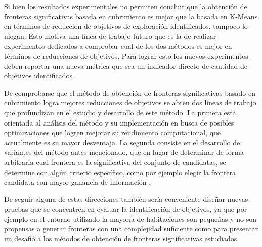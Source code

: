 
Si bien los resultados experimentales no permiten concluir que la
obtención de fronteras significativas basada en cubrimiento es mejor que la basada en K-Means
en términos de reducción de objetivos de exploración identificados, tampoco
lo niegan. Esto motiva una línea de trabajo futuro que es la de realizar
experimentos dedicados a comprobar cual de los dos métodos es mejor en términos
de reducciones de objetivos. Para lograr esto los nuevos experimentos deben
reportar una nueva métrica que sea un indicador directo de cantidad de
objetivos identificados.

De comprobarse que el método de obtención de fronteras significativas basado en
cubrimiento logra
mejores reducciones de objetivos se abren dos líneas de
trabajo que profundizan en el estudio y desarrollo de este método. La primera
está orientada al análisis del método y su implementación en busca de posibles
optimizaciones que logren mejorar su rendimiento computacional, que actualmente
es su mayor desventaja. La segunda consiste en el desarrollo de variantes del
método antes mencionado, que en lugar de determinar de forma arbitraria cual
frontera es la significativa del conjunto de candidatas, se determine con algún
criterio específico, como por ejemplo elegir la frontera candidata con mayor
ganancia de información \cite{Amorin2019}.

De seguir alguna de estas direcciones también sería conveniente diseñar nuevas
pruebas que se concentren en evaluar la identificación de objetivos, ya que por
ejemplo en el entorno utilizado la mayoría de habitaciones son pequeñas y no son
propensas a generar fronteras con una complejidad suficiente como para
presentar un desafió a los métodos de obtención de fronteras significativas estudiados.




